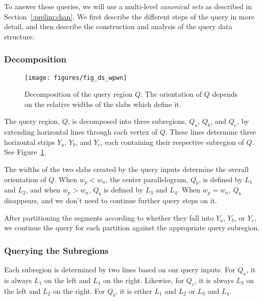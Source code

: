 To answer these queries, we will use a multi-level \emph{canonical sets} as described in Section~\ref{:prelim:chan}. We first describe the different steps of the query in more detail, and then describe the construction and analysis of the query data structure.



\subsubsection{Decomposition}

\begin{figure}
\begin{center}
  \texttt{[image: figures/fig\_ds\_wpwn]}
  \caption[Decomposition of the query region $Q$]{Decomposition of the query region $Q$. The orientation of $Q$ depends on the relative widths of the slabs which define it.}
  \label{fig:slabs:two:wpwn}
\end{center}
\end{figure}

The query region, $Q$, is decomposed into three subregions, $Q_a$, $Q_b$, and $Q_c$, by extending horizontal lines through each vertex of $Q$. These lines determine three horizontal strips $Y_a$, $Y_b$, and $Y_c$, each containing their respective subregion of $Q$. See Figure~\ref{fig:slabs:two:wpwn}.

The widths of the two slabs created by the query inputs determine the overall orientation of $Q$. When $w_p < w_n$, the center parallelogram, $Q_b$, is defined by $L_1$ and $L_2$, and when $w_p > w_n$, $Q_b$ is defined by $L_3$ and $L_4$. When $w_p = w_n$, $Q_b$ disappears, and we don't need to continue further query steps on it.

After partitioning the segments according to whether they fall into $Y_a$, $Y_b$, or $Y_c$, we continue the query for each partition against the appropriate query subregion.


\subsubsection{Querying the Subregions}

Each subregion is determined by two lines based on our query inputs. For $Q_a$, it is always $L_1$ on the left and $L_4$ on the right. Likewise, for $Q_c$, it is always $L_3$ on the left and $L_2$ on the right. For $Q_b$, it is either $L_1$ and $L_2$ or  $L_3$ and $L_4$.

